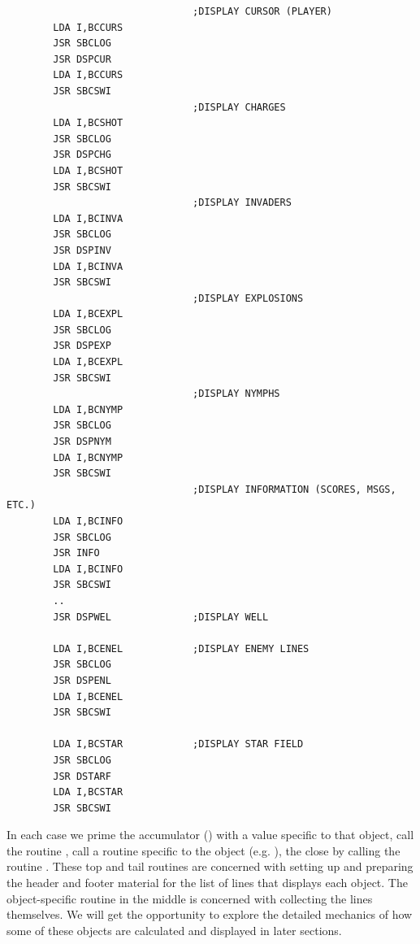 \begin{lstlisting}
                                ;DISPLAY CURSOR (PLAYER)
        LDA I,BCCURS
        JSR SBCLOG
        JSR DSPCUR
        LDA I,BCCURS
        JSR SBCSWI
                                ;DISPLAY CHARGES
        LDA I,BCSHOT
        JSR SBCLOG
        JSR DSPCHG
        LDA I,BCSHOT
        JSR SBCSWI
                                ;DISPLAY INVADERS
        LDA I,BCINVA
        JSR SBCLOG
        JSR DSPINV
        LDA I,BCINVA
        JSR SBCSWI
                                ;DISPLAY EXPLOSIONS
        LDA I,BCEXPL
        JSR SBCLOG
        JSR DSPEXP
        LDA I,BCEXPL
        JSR SBCSWI
                                ;DISPLAY NYMPHS
        LDA I,BCNYMP
        JSR SBCLOG
        JSR DSPNYM
        LDA I,BCNYMP
        JSR SBCSWI
                                ;DISPLAY INFORMATION (SCORES, MSGS, ETC.)
        LDA I,BCINFO
        JSR SBCLOG
        JSR INFO
        LDA I,BCINFO
        JSR SBCSWI
        ..
        JSR DSPWEL              ;DISPLAY WELL

        LDA I,BCENEL            ;DISPLAY ENEMY LINES
        JSR SBCLOG
        JSR DSPENL
        LDA I,BCENEL
        JSR SBCSWI

        LDA I,BCSTAR            ;DISPLAY STAR FIELD
        JSR SBCLOG
        JSR DSTARF
        LDA I,BCSTAR
        JSR SBCSWI
\end{lstlisting}

In each case we prime the accumulator () with a value specific to that object, call the routine , call a routine
specific to the object (e.g. ), the close by calling the routine . These top and tail routines are concerned
with setting up and preparing the header and footer material for the list of lines that displays each object. The object-specific routine
in the middle is concerned with collecting the lines themselves. We will get the opportunity to explore the detailed mechanics of how
some of these objects are calculated and displayed in later sections.
